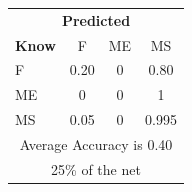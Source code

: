 \documentclass[12pt]{article} %
\begin{document}
\begin{minipage}{0.5\textwidth}
\begin{center}
\begin{tabular}{l|c|c|c|}
 \multicolumn{4}{c}{ \textbf{ Predicted}}\\
 \textbf{Know}&F&ME&MS\\ \hline\hline
F   &0.20&0&0.80\\
ME &0&0&1\\
MS &0.05&0&0.995\\
\multicolumn{4}{c}{Average Accuracy is 0.40}\\
\multicolumn{4}{c}{25\%  of the net}\\
\end{tabular}
\end{center}
\end{minipage}
\end{document}
